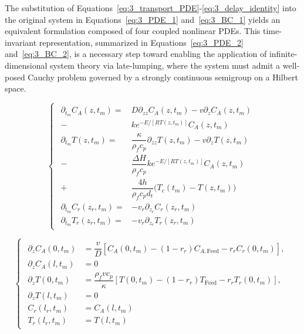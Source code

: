 The substitution of Equations~\eqref{eq:3_transport_PDE}-\eqref{eq:3_delay_identity} into the original system in Equations~\eqref{eq:3_PDE_1} and~\eqref{eq:3_BC_1} yields an equivalent formulation composed of four coupled nonlinear PDEs. This time-invariant representation, summarized in Equations~\eqref{eq:3_PDE_2} and~\eqref{eq:3_BC_2}, is a necessary step toward enabling the application of infinite-dimensional system theory via late-lumping, where the system must admit a well-posed Cauchy problem governed by a strongly continuous semigroup on a Hilbert space.


\begin{equation} \label{eq:3_PDE_2}
\begin{cases}
\begin{alignedat}{2}
    \partial_{t_m} C_{A}(z, t_m) = & D \partial_{zz} C_{A}(z, t_m) 
    - v \partial_z C_{A}(z, t_m) \\[1.2ex]
    -& k e^{-E/\left[R T(z, t_m)\right]} C_{A}(z, t_m) \\[2.5ex]

    \partial_{t_m} T(z, t_m) = &\dfrac{\kappa}{\rho_f c_p} \partial_{zz} T(z, t_m) 
    - v \partial_z T(z, t_m) \\[1.2ex]
    -& \dfrac{\Delta H}{\rho_f c_p} k e^{-E/\left[R T(z, t_m)\right]} C_{A}(z, t_m)\\[1.2ex]
    +& \dfrac{4h}{\rho_f c_p d_t} \bigl( T_c(t_m) - T(z, t_m) \bigr) \\[2.5ex]

    \partial_{t_m} C_r(z_r, t_m) = &- v_r \partial_{z_r} C_r(z_r, t_m) \\[2.5ex]

    \partial_{t_m} T_r(z_r, t_m) = &- v_r \partial_{z_r} T_r(z_r, t_m)
\end{alignedat}
\end{cases}
\end{equation}

\begin{equation} \label{eq:3_BC_2}
\begin{cases}
\begin{alignedat}{2}
    \partial_z C_{A}(0, t_m) &= \dfrac{v}{D} \left[ C_{A}(0, t_m) - (1 - r_r) C_{A,\text{Feed}} - r_r C_r(0, t_m) \right], \\[1.5ex] \partial_z C_{A}(l, t_m) &= 0 \\[1.5ex]

    \partial_z T(0, t_m) &= \dfrac{\rho_f v c_p}{\kappa} \left[ T(0, t_m) - (1 - r_r) T_\text{Feed} - r_r T_r(0, t_m) \right], \\[1.5ex] \partial_z T(l, t_m) &= 0 \\[1.5ex]

    C_r(l_r, t_m) &= C_{A}(l, t_m) \\[1.5ex]
    T_r(l_r, t_m) &= T(l, t_m)
\end{alignedat}
\end{cases}
\end{equation}

